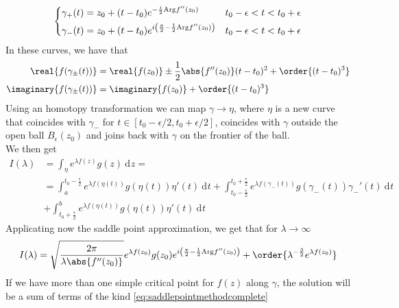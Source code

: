 \documentclass[a4paper, 11pt]{book}
\newcommand{\1}{\opr{\mathds{1}}}
\newcommand{\diff}[2][]{\ \mathrm{d}^{#1}#2}
\theoremstyle{plain}
\begin{document}
	\begin{equation}
		\begin{dcases}
			\gamma_+(t)=z_0+(t-t_0)e^{-\frac{i}{2}\mathrm{Arg}f''(z_0)}&t_0-\epsilon<t<t_0+\epsilon\\
			\gamma_-(t)=z_0+(t-t_0)e^{i\left( \frac{\pi}{2}-\frac{1}{2}\mathrm{Arg}f''(z_0) \right)}&t_0-\epsilon<t<t_0+\epsilon
		\end{dcases}
		\label{eq:steepestcurves}
	\end{equation}
	In these curves, we have that
	\begin{equation*}
		\begin{aligned}
			\real{f(\gamma_{\pm}(t))}&=\real{f(z_0)}\pm\frac{1}{2}\abs{f''(z_0)}(t-t_0)^2+\order{(t-t_0)^3}\\
			\imaginary{f(\gamma_{\pm}(t))}&=\imaginary{f(z_0)}+\order{(t-t_0)^3}
		\end{aligned}
	\end{equation*}
	Using an homotopy transformation we can map $\gamma\to\eta$, where $\eta$ is a new curve that coincides with $\gamma_-$ for $t\in[t_0-\epsilon/2,t_0+\epsilon/2]$, coincides with $\gamma$ outside the open ball $B_\epsilon(z_0)$ and joins back with $\gamma$ on the frontier of the ball.\\
	We then get
	\begin{equation}
		\begin{aligned}
			I(\lambda)&=\int_{\eta}e^{\lambda f(z)}g(z)\diff{z}=\\
			&=\int_{a}^{t_0-\frac{\epsilon}{2}}e^{\lambda f(\eta(t))}g(\eta(t))\eta'(t)\diff{t}+\int_{t_0-\frac{\epsilon}{2}}^{t_0+\frac{\epsilon}{2}}e^{\lambda f(\gamma_-(t))}g(\gamma_-(t))\gamma_-'(t)\diff{t}\\
			&+\int_{t_0+\frac{\epsilon}{2}}^{b}e^{\lambda f(\eta(t))}g(\eta(t))\eta'(t)\diff{t}
		\end{aligned}
		\label{eq:integralhomotopy}
	\end{equation}
	Applicating now the saddle point approximation, we get that for $\lambda\to\infty$
	\begin{equation}
		I(\lambda)=\sqrt{\frac{2\pi}{\lambda\abs{f''(z_0)}}}e^{\lambda f(z_0)}g(z_0)e^{i\left( \frac{\pi}{2}-\frac{1}{2}\mathrm{Arg}f''(z_0) \right)}+\order{\lambda^{-\frac{3}{2}}e^{\lambda f(z_0)}}
		\label{eq:saddlepointmethodcomplete}
	\end{equation}
	If we have more than one simple critical point for $f(z)$ along $\gamma$, the solution will be a sum of terms of the kind \eqref{eq:saddlepointmethodcomplete}
\end{document}
